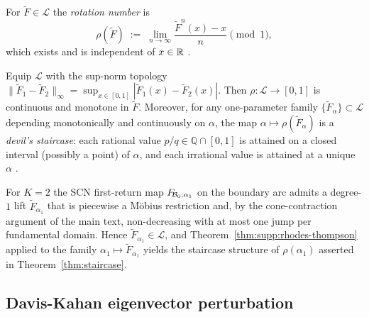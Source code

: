 \begin{definition}\label{def:rotation-number}
For $\widetilde F\in\mathcal{L}$ the \emph{rotation number} is
\[
\rho(\widetilde F)\;:=\;\lim_{n\to\infty}\frac{\widetilde F^{n}(x)-x}{n}\pmod 1 ,
\]
which exists and is independent of $x\in\mathbb{R}$ \citep{poincare1885courbes,rhodes1991topologies}.
\end{definition}

\begin{theorem}\label{thm:supp:rhodes-thompson}
Equip $\mathcal{L}$ with the sup-norm topology $\|\widetilde F_1-\widetilde F_2\|_\infty=\sup_{x\in[0,1]}|\widetilde F_1(x)-\widetilde F_2(x)|$. Then $\rho:\mathcal{L}\to[0,1]$ is continuous and monotone in $\widetilde F$. Moreover, for any one-parameter family $\{\widetilde F_\alpha\}\subset\mathcal{L}$ depending monotonically and continuously on $\alpha$, the map $\alpha\mapsto\rho(\widetilde F_\alpha)$ is a \emph{devil's staircase}: each rational value $p/q\in\mathbb{Q}\cap[0,1]$ is attained on a closed interval (possibly a point) of $\alpha$, and each irrational value is attained at a unique $\alpha$ \citep{rhodes1991topologies,alseda2000combinatorial,herman1979conjugaison}.
\end{theorem}

\begin{remark}\label{rem:supp:scn-rhodes}
For $K=2$ the SCN first-return map $F_{\!\mathcal{B}_0;\alpha_1}$ on the boundary arc admits a degree-$1$ lift $\widetilde F_{\alpha_1}$ that is piecewise a M\"obius restriction and, by the cone-contraction argument of the main text, non-decreasing with at most one jump per fundamental domain. Hence $\widetilde F_{\alpha_1}\in\mathcal{L}$, and Theorem~\ref{thm:supp:rhodes-thompson} applied to the family $\alpha_1\mapsto\widetilde F_{\alpha_1}$ yields the staircase structure of $\rho(\alpha_1)$ asserted in Theorem~\ref{thm:staircase}.
\end{remark}

\subsection{Davis-Kahan eigenvector perturbation}\label{sec:supp:davis-kahan}

